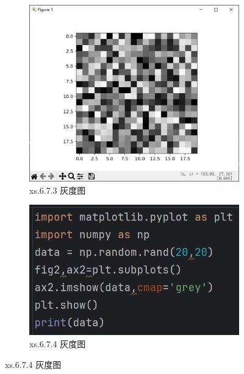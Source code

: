 \documentclass[12pt]{article}
\begin{document}
\begin{figure}[H]
    \centering
    \begin{subfigure}[b]{0.48\textwidth}
        \includegraphics[width=\textwidth]{颜色映射 二维 Pic2.png} %
        \caption{xs.6.7.3 灰度图}
        \label{fig:line-graph2}
    \end{subfigure}
    \hfill
    \begin{subfigure}[b]{0.48\textwidth}
        \includegraphics[width=\textwidth]{颜色映射 二维 program2.png} %
        \caption{xs.6.7.4 灰度图}
        \label{fig:line-graph2-pic2}
    \end{subfigure}
\end{figure}
\end{document}
